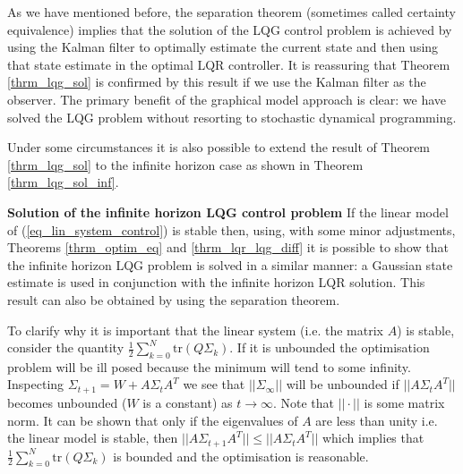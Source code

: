 As we have mentioned before, the separation theorem (sometimes called certainty equivalence) implies that the solution of the LQG control problem is achieved by using the Kalman filter to optimally estimate the current state and then using that state estimate in the optimal LQR controller. It is reassuring that Theorem \ref{thrm_lqg_sol} is confirmed by this result if we use the Kalman filter as the observer. The primary benefit of the graphical model approach is clear: we have solved the LQG problem without resorting to stochastic dynamical programming.

Under some circumstances it is also possible to extend the result of Theorem \ref{thrm_lqg_sol} to the infinite horizon case as shown in Theorem \ref{thrm_lqg_sol_inf}.
\begin{thrm}
\textbf{Solution of the infinite horizon LQG control problem} If the linear model of (\ref{eq_lin_system_control}) is stable then, using, with some minor adjustments, Theorems \ref{thrm_optim_eq} and \ref{thrm_lqr_lqg_diff} it is possible to show that the infinite horizon LQG problem is solved in a similar manner: a Gaussian state estimate is used in conjunction with the infinite horizon LQR solution. This result can also be obtained by using the separation theorem. \label{thrm_lqg_sol_inf}
\end{thrm}
To clarify why it is important that the linear system (i.e. the matrix $A$) is stable, consider the quantity $\frac{1}{2}\sum_{k=0}^N \text{tr}(Q\Sigma_k)$. If it is unbounded the optimisation problem will be ill posed because the minimum will tend to some infinity. Inspecting $\Sigma_{t+1} = W+A\Sigma_t A^T$ we see that $||\Sigma_{\infty}||$ will be unbounded if $||A\Sigma_t A^T||$ becomes unbounded ($W$ is a constant) as $t \rightarrow \infty$. Note that $||\cdot||$ is some matrix norm. It can be shown that only if the eigenvalues of $A$ are less than unity i.e. the linear model is stable, then $||A\Sigma_{t+1}A^T|| \leq ||A\Sigma_{t}A^T||$ which implies that $\frac{1}{2}\sum_{k=0}^N \text{tr}(Q\Sigma_k)$ is bounded and the optimisation is reasonable.

